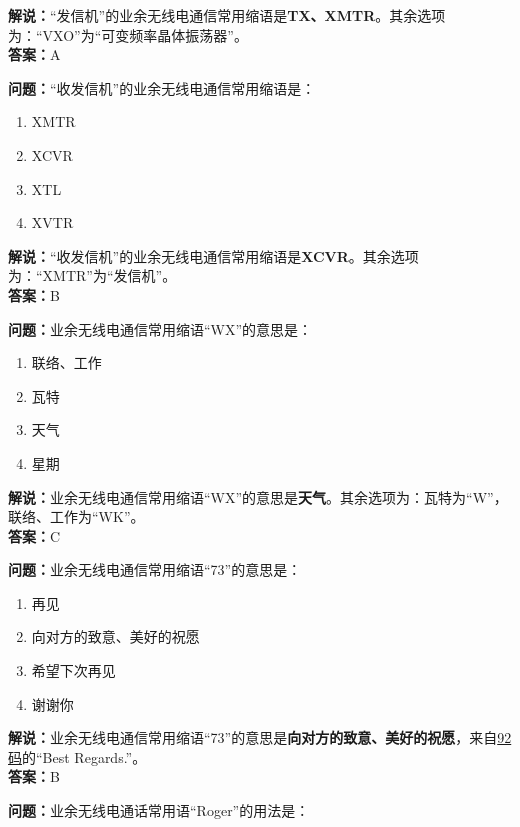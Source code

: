 \textbf{解说：}“发信机”的业余无线电通信常用缩语是\textbf{TX、XMTR}。其余选项为：“VXO”为“可变频率晶体振荡器”。\\\textbf{答案：}A



\textbf{问题：}“收发信机”的业余无线电通信常用缩语是：

\begin{enumerate}[label=\Alph*), leftmargin=1.5cm]
	\item XMTR
	\item XCVR
	\item XTL
	\item XVTR
\end{enumerate}

\textbf{解说：}“收发信机”的业余无线电通信常用缩语是\textbf{XCVR}。其余选项为：“XMTR”为“发信机”。\\\textbf{答案：}B



\textbf{问题：}业余无线电通信常用缩语“WX”的意思是：

\begin{enumerate}[label=\Alph*), leftmargin=1.5cm]
	\item 联络、工作
	\item 瓦特
	\item 天气
	\item 星期
\end{enumerate}

\textbf{解说：}业余无线电通信常用缩语“WX”的意思是\textbf{天气}。其余选项为：瓦特为“W”，联络、工作为“WK”。\\\textbf{答案：}C



\textbf{问题：}业余无线电通信常用缩语“73”的意思是：

\begin{enumerate}[label=\Alph*), leftmargin=1.5cm]
	\item 再见
	\item 向对方的致意、美好的祝愿
	\item 希望下次再见
	\item 谢谢你
\end{enumerate}

\textbf{解说：}业余无线电通信常用缩语“73”的意思是\textbf{向对方的致意、美好的祝愿}，来自\href{https://en.wikipedia.org/wiki/Wire_signal}{92码}的“Best Regards.”。\\\textbf{答案：}B



\textbf{问题：}业余无线电通话常用语“Roger”的用法是：

